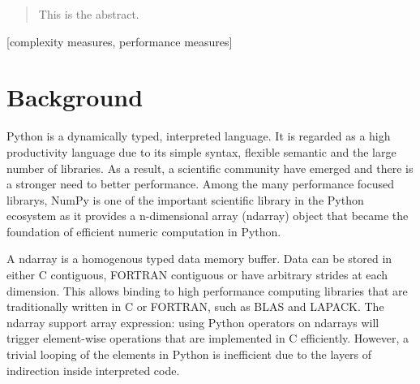 \documentclass{acm_proc_article-sp}
\begin{document}
\date{30 July 1999}

\maketitle
\begin{abstract}
This is the abstract.
\end{abstract}

[complexity measures, performance measures]



\section{Background}

Python is a dynamically typed, interpreted language.
It is regarded as a high productivity language due to its simple syntax,
flexible semantic and the large number of libraries.
As a result, a scientific community have emerged and there is a stronger need
to better performance.
Among the many performance focused librarys, NumPy is one of the important
scientific library in the Python ecosystem as it provides a n-dimensional
array (ndarray) object that became the foundation of efficient numeric
computation in Python.

A ndarray is a homogenous typed data memory buffer.
Data can be stored in either C contiguous, FORTRAN contiguous or have arbitrary
strides at each dimension.  This allows binding to high performance computing
libraries that are traditionally written in C or FORTRAN, such as BLAS and
LAPACK. The ndarray support array expression: using Python operators on
ndarrays will trigger element-wise operations that are implemented in C
efficiently.  However, a trivial looping of the elements in Python is
inefficient due to the layers of indirection inside interpreted code.
\end{document}
